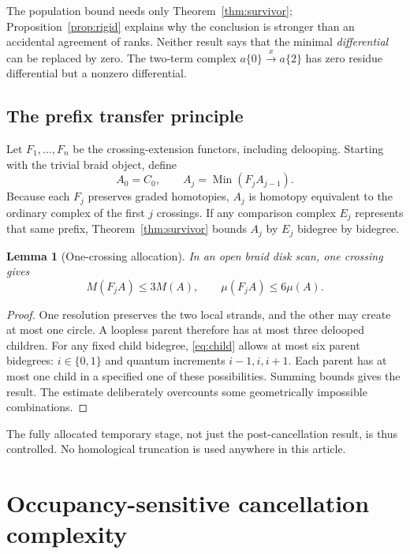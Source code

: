 \documentclass[11pt,letterpaper]{article}
\newtheorem{lemma}[theorem]{Lemma}
\theoremstyle{remark}\newtheorem{remark}[theorem]{Remark}
\newcommand{\Min}{\operatorname{Min}}
\begin{document}
The population bound needs only Theorem~\ref{thm:survivor}; Proposition~\ref{prop:rigid} explains why the conclusion is stronger than an accidental agreement of ranks. Neither result says that the minimal \emph{differential} can be replaced by zero. The two-term complex $a\{0\}\xrightarrow{x}a\{2\}$ has zero residue differential but a nonzero differential.

\subsection{The prefix transfer principle}
Let $F_1,\ldots,F_n$ be the crossing-extension functors, including delooping. Starting with the trivial braid object, define
\[
 A_0=C_0,\qquad A_j=\Min(F_jA_{j-1}).
\]
Because each $F_j$ preserves graded homotopies, $A_j$ is homotopy equivalent to the ordinary complex of the first $j$ crossings. If any comparison complex $E_j$ represents that same prefix, Theorem~\ref{thm:survivor} bounds $A_j$ by $E_j$ bidegree by bidegree.

\begin{lemma}[One-crossing allocation]\label{lem:extension}
In an open braid disk scan, one crossing gives
\[
 M(F_jA)\le 3M(A),\qquad \mu(F_jA)\le 6\mu(A).
\]
\end{lemma}
\begin{proof}
One resolution preserves the two local strands, and the other may create at most one circle. A loopless parent therefore has at most three delooped children. For any fixed child bidegree, \eqref{eq:child} allows at most six parent bidegrees: $i\in\{0,1\}$ and quantum increments $i-1,i,i+1$. Each parent has at most one child in a specified one of these possibilities. Summing bounds gives the result. The estimate deliberately overcounts some geometrically impossible combinations.
\end{proof}
The fully allocated temporary stage, not just the post-cancellation result, is thus controlled. No homological truncation is used anywhere in this article.

\section{Occupancy-sensitive cancellation complexity}\label{sec:complexity}
\end{document}
